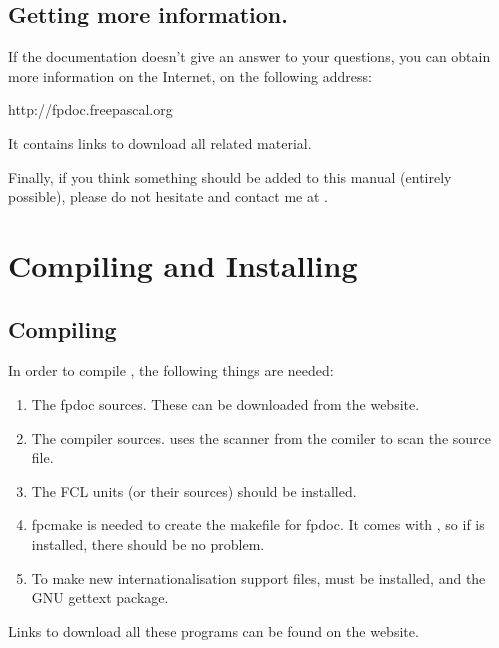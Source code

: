 \section{Getting more information.}
If the documentation doesn't give an answer to your questions,
you can obtain more information on the Internet, on the following address: 

{http://fpdoc.freepascal.org} 

It contains links to download all \fpdoc related material.

Finally, if you think something should be added to this manual
(entirely possible), please do not hesitate and contact me at
.

\chapter{Compiling and Installing \fpdoc}
\label{ch:Installation}

\section{Compiling}
In order to compile \fpdoc, the following things are needed:
\begin{enumerate}
\item The fpdoc sources. These can be downloaded from the \fpdoc website.
\item The \fpc compiler sources. \fpdoc uses the scanner from the \fpc
comiler to scan the source file.
\item The FCL units (or their sources) should be installed. 
\item fpcmake is needed to create the makefile for fpdoc. It comes with
\fpc, so if \fpc is installed, there should be no problem.
\item To make new internationalisation support files,  must be
installed, and the GNU gettext package.
\end{enumerate}
Links to download all these programs can be found on the \fpdoc website.

